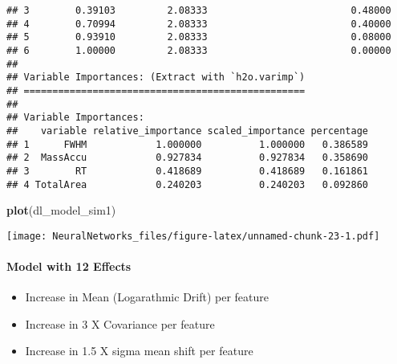 \documentclass[]{article}
\newenvironment{Shaded}{\begin{snugshade}}{\end{snugshade}}
\newcommand{\KeywordTok}[1]{\textcolor[rgb]{0.13,0.29,0.53}{\textbf{#1}}}
\newcommand{\NormalTok}[1]{#1}
\providecommand{\tightlist}{%
  \setlength{\itemsep}{0pt}\setlength{\parskip}{0pt}}
\let\oldparagraph\paragraph
\renewcommand{\paragraph}[1]{\oldparagraph{#1}\mbox{}}
\begin{document}
\begin{verbatim}
## 3        0.39103         2.08333                         0.48000
## 4        0.70994         2.08333                         0.40000
## 5        0.93910         2.08333                         0.08000
## 6        1.00000         2.08333                         0.00000
## 
## Variable Importances: (Extract with `h2o.varimp`) 
## =================================================
## 
## Variable Importances: 
##    variable relative_importance scaled_importance percentage
## 1      FWHM            1.000000          1.000000   0.386589
## 2  MassAccu            0.927834          0.927834   0.358690
## 3        RT            0.418689          0.418689   0.161861
## 4 TotalArea            0.240203          0.240203   0.092860
\end{verbatim}

\begin{Shaded}
\begin{Highlighting}[]
\KeywordTok{plot}\NormalTok{(dl_model_sim1)}
\end{Highlighting}
\end{Shaded}

\texttt{[image: NeuralNetworks\_files/figure-latex/unnamed-chunk-23-1.pdf]}

\paragraph{Model with 12 Effects}\label{model-with-12-effects}

\begin{itemize}
\tightlist
\item
  Increase in Mean (Logarathmic Drift) per feature
\item
  Increase in 3 X Covariance per feature
\item
  Increase in 1.5 X sigma mean shift per feature
\end{itemize}
\end{document}

